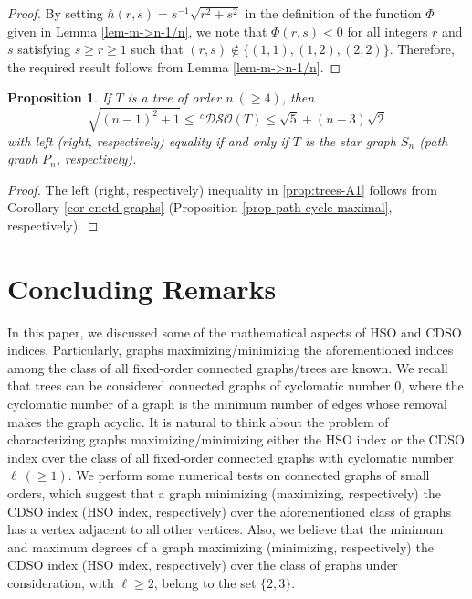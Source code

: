 \documentclass[12pt,a4paper]{article}
\newtheorem{proposition}{Proposition}[section]
\begin{document}
\begin{proof}
By setting $\hbar(r,s)=s^{-1}\sqrt{r^2+s^2}$ in the definition of the function $\Phi$ given in Lemma \ref{lem-m->n-1/n}, we note that
$\Phi(r,s)<0$
 for all integers $r$ and $s$ satisfying $s\ge r\ge 1$ such that $(r,s)\not\in\{(1,1),(1,2),(2,2)\}$.
Therefore, the required result follows from Lemma \ref{lem-m->n-1/n}.
\end{proof}


\begin{proposition}\label{prop:trees-CDSO}
If $T$ is a tree of order $n\ (\ge 4)$, then
\begin{equation}\label{prop:trees-A1}
\sqrt{(n-1)^2+1}\le\, ^c\mathcal{DSO}(T)   \le \sqrt{5}+(n-3)\sqrt{2}
\end{equation}
with left (right, respectively) equality if and only if $T$ is the star graph $S_n$ (path graph $P_n$, respectively).

\end{proposition}




\begin{proof}
The left (right, respectively) inequality in \eqref{prop:trees-A1} follows from Corollary \ref{cor-cnctd-graphs}  (Proposition \ref{prop-path-cycle-maximal}, respectively).
\end{proof}





\section{Concluding Remarks}
In this paper, we discussed some of the mathematical aspects of HSO and CDSO indices. Particularly, graphs maximizing/minimizing the aforementioned indices among the class of all fixed-order connected graphs/trees are known. We recall that trees can be considered connected graphs of cyclomatic number $0$, where the cyclomatic number of a graph is the minimum number of edges whose removal makes the graph acyclic. It is natural to think about the problem of characterizing graphs maximizing/minimizing either the HSO index or the CDSO index over the class of all fixed-order connected graphs with cyclomatic number $\ell\ (\ge1)$. We perform some numerical tests on connected graphs of small orders, which suggest that a graph minimizing (maximizing, respectively) the CDSO index (HSO index, respectively) over the aforementioned class of graphs has a vertex adjacent to all other vertices. Also, we believe that the minimum and maximum degrees of a graph maximizing (minimizing, respectively) the CDSO index (HSO index, respectively) over the class of graphs under consideration, with $\ell\ge2$, belong to the set $\{2,3\}$.
\end{document}
